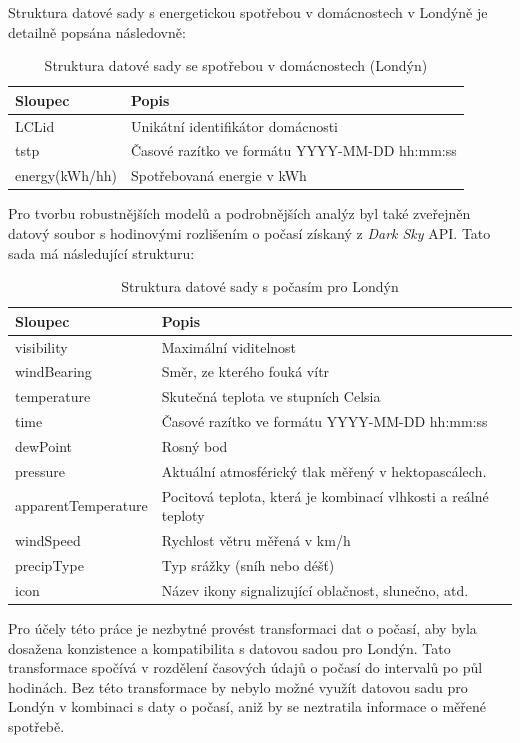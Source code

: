 \documentclass[FM,BP,fonts]{tulthesis}
\begin{document}
Struktura datové sady s energetickou spotřebou v domácnostech v Londýně je detailně popsána následovně:
 \renewcommand{\arraystretch}{1.1}
\begin{table}[!ht]
	\centering
	\caption{Struktura datové sady se spotřebou v domácnostech (Londýn)}
	\begin{tabularx}{\linewidth}{ll}
		\hline
		\textbf{Sloupec} & \textbf{Popis} \\ \hline
		LCLid & Unikátní identifikátor domácnosti \\ 
		tstp & Časové razítko ve formátu YYYY-MM-DD hh:mm:ss \\ 
		energy(kWh/hh) & Spotřebovaná energie v kWh \\ 
		\hline
	\end{tabularx}
\end{table}

Pro tvorbu robustnějších modelů a podrobnějších analýz byl také zveřejněn datový soubor s hodinovými rozlišením o počasí získaný z \textit{Dark Sky} API. Tato sada má následující strukturu:


\begin{table}[!ht]
	\centering
	\caption{Struktura datové sady s počasím pro Londýn}
	\begin{tabularx}{\linewidth}{lX}
		\hline
		\textbf{Sloupec} & \textbf{Popis} \\ \hline
		visibility & Maximální viditelnost \\ 
		windBearing & Směr, ze kterého fouká vítr \\ 
		temperature & Skutečná teplota ve stupních Celsia \\ 
		time & Časové razítko ve formátu YYYY-MM-DD hh:mm:ss	 \\ 
		dewPoint & Rosný bod \\ 
		pressure & Aktuální atmosférický tlak měřený v hektopascálech. \\ 
		apparentTemperature & Pocitová teplota, která je kombinací vlhkosti a reálné teploty \\ 
		windSpeed & Rychlost větru měřená v km/h \\ 
		precipType & Typ srážky (sníh nebo déšť) \\
		icon & Název ikony signalizující oblačnost, slunečno, atd.  \\ 
		\hline
	\end{tabularx}
\end{table}


Pro účely této práce je nezbytné provést transformaci dat o počasí, aby byla dosažena konzistence a kompatibilita s datovou sadou pro Londýn. Tato transformace spočívá v rozdělení časových údajů o počasí do intervalů po půl hodinách. Bez této transformace by nebylo možné využít datovou sadu pro Londýn v kombinaci s daty o počasí, aniž by se neztratila informace o měřené spotřebě.
\end{document}
